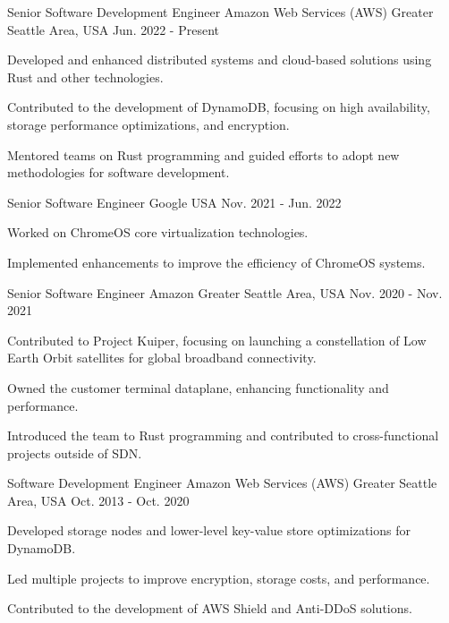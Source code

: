 \begin{cventries}
\cventry
  {Senior Software Development Engineer} %
  {Amazon Web Services (AWS)} %
  {Greater Seattle Area, USA} %
  {Jun. 2022 - Present} %
  {
    \begin{cvitems} %
      \item {Developed and enhanced distributed systems and cloud-based solutions using Rust and other technologies.}
      \item {Contributed to the development of DynamoDB, focusing on high availability, storage performance optimizations, and encryption.}
      \item {Mentored teams on Rust programming and guided efforts to adopt new methodologies for software development.}
    \end{cvitems}
  }

\cventry
  {Senior Software Engineer} %
  {Google} %
  {USA} %
  {Nov. 2021 - Jun. 2022} %
  {
    \begin{cvitems} %
      \item {Worked on ChromeOS core virtualization technologies.}
      \item {Implemented enhancements to improve the efficiency of ChromeOS systems.}
    \end{cvitems}
  }

\cventry
  {Senior Software Engineer} %
  {Amazon} %
  {Greater Seattle Area, USA} %
  {Nov. 2020 - Nov. 2021} %
  {
    \begin{cvitems} %
      \item {Contributed to Project Kuiper, focusing on launching a constellation of Low Earth Orbit satellites for global broadband connectivity.}
      \item {Owned the customer terminal dataplane, enhancing functionality and performance.}
      \item {Introduced the team to Rust programming and contributed to cross-functional projects outside of SDN.}
    \end{cvitems}
  }

\cventry
  {Software Development Engineer} %
  {Amazon Web Services (AWS)} %
  {Greater Seattle Area, USA} %
  {Oct. 2013 - Oct. 2020} %
  {
    \begin{cvitems} %
      \item {Developed storage nodes and lower-level key-value store optimizations for DynamoDB.}
      \item {Led multiple projects to improve encryption, storage costs, and performance.}
      \item {Contributed to the development of AWS Shield and Anti-DDoS solutions.}
    \end{cvitems}
  }

\
\end{cventries}
